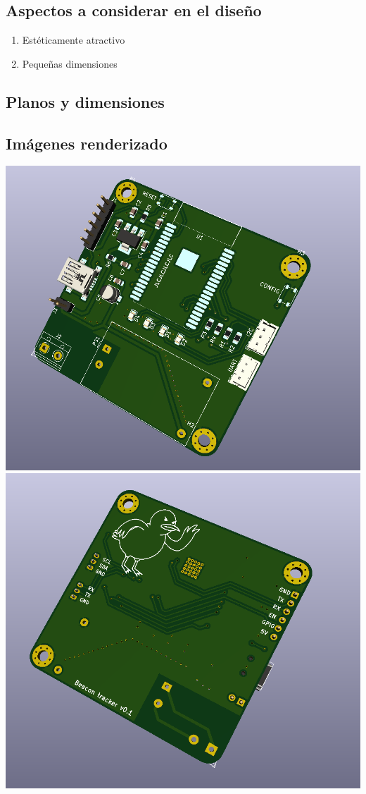 \documentclass[a4paper ,12pt, onecolumn]{article}
\begin{document}
    \subsection{Aspectos a considerar en el diseño}
        \begin{enumerate}
            \item Estéticamente atractivo
            \item Pequeñas dimensiones
        \end{enumerate}
    \subsection{Planos y dimensiones}
    \subsection{Imágenes renderizado}   
        \includegraphics[scale=0.4]{../receiver_1.PNG}
        \includegraphics[scale=0.4]{../receiver_2.PNG}
\end{document}
